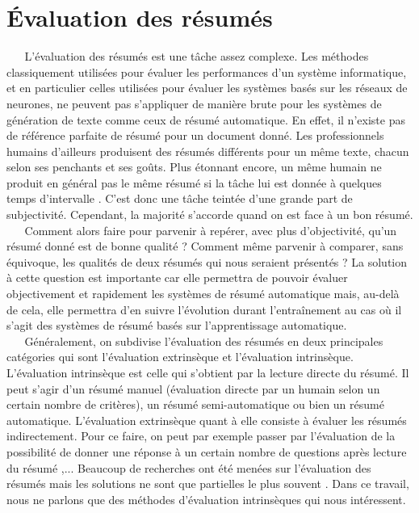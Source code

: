 \section{Évaluation des résumés}\label{sectionSurROUGE}
$ _{} $ $ _{} $ $ _{} $ $ _{} $ $ _{} $L'évaluation des résumés est une tâche assez complexe. Les méthodes cla\-ssi\-que\-ment utilisées pour évaluer les performances d'un système informatique, et en particulier celles utilisées pour évaluer les systèmes basés sur les réseaux de neurones, ne peuvent pas s'appliquer de manière brute pour les systèmes de génération de texte comme ceux de résumé automatique. En effet, il n'existe pas de référence parfaite de résumé pour un document donné. Les professionnels humains d'ailleurs produisent des résumés différents pour un même texte, chacun selon ses penchants et ses goûts. Plus étonnant encore, un même humain ne produit en général pas le même résumé si la tâche lui est donnée à quelques temps d'intervalle \cite{rath1961formation}. C'est donc une tâche teintée d'une grande part de subjectivité. Cependant, la majorité s'accorde quand on est face à un bon résumé.\\
$ _{} $ $ _{} $ $ _{} $ $ _{} $ $ _{} $Comment alors faire pour parvenir à repérer, avec plus d'objectivité, qu'un résumé donné est de bonne qualité ? Comment même parvenir à comparer, sans équivoque, les qualités de deux résumés qui nous seraient présentés ? La solution à cette question est importante car elle permettra de pouvoir évaluer objectivement et rapidement les systèmes de résumé automatique mais, au-delà de cela, elle permettra d'en suivre l'évolution durant l'entraînement au cas où il s'agit des systèmes de résumé basés sur l'apprentissage automatique.\\
$ _{} $ $ _{} $ $ _{} $ $ _{} $ $ _{} $Généralement, on subdivise l'évaluation des résumés en deux principales catégories qui sont l'évaluation extrinsèque et l'évaluation intrinsèque\cite{jones1995evaluating}. L'évaluation intrinsèque est celle qui s'obtient par la lecture directe du résumé. Il peut s'agir d'un résumé manuel (évaluation directe par un humain selon un certain nombre de critères), un résumé semi-automatique ou bien un résumé automatique. L'évaluation extrinsèque quant à elle consiste à évaluer les résumés indirectement. Pour ce faire, on peut par exemple passer par l'évaluation de la possibilité de donner une réponse à un certain nombre de questions après lecture du résumé \cite{maybury1999advances},... Beaucoup de recherches ont été menées sur l'évaluation des résumés mais les solutions ne sont que partielles le plus souvent \cite{lin2004rouge,hirschberg2005summaries,louis2008automatic, saggion2010multilingual}. Dans ce travail, nous ne parlons que des méthodes d'évaluation intrinsèques qui nous intéressent.
